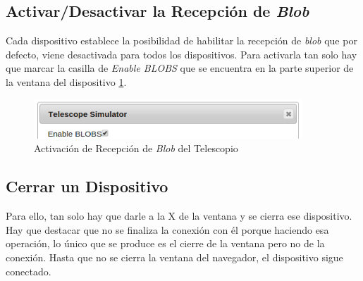 \subsection{Activar/Desactivar la Recepción de \textit{Blob}}
Cada dispositivo establece la posibilidad de habilitar la recepción de \textit{blob} que por defecto, viene desactivada para todos los dispositivos. Para activarla tan solo hay que marcar la casilla de \textit{Enable BLOBS} que se encuentra en la parte superior de la ventana del dispositivo \ref{fig:activacionBlob}.
\begin{figure}[htb]
\centering
\includegraphics[width=0.9\textwidth]{./imagenes/activacionBlob}
\caption{Activación de Recepción de \textit{Blob} del Telescopio} \label{fig:activacionBlob}
\end{figure}

\subsection{Cerrar un Dispositivo}
Para ello, tan solo hay que darle a la X de la ventana y se cierra ese dispositivo. Hay que destacar que no se finaliza la conexión con él porque haciendo esa operación, lo único que se produce es el cierre de la ventana pero no de la conexión. Hasta que no se cierra la ventana del navegador, el dispositivo sigue conectado. 

